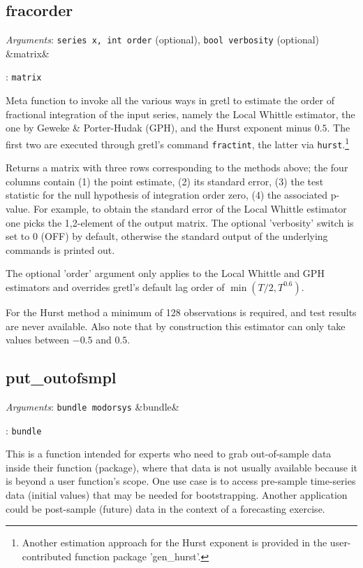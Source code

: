 \documentclass[11pt,english]{article}
\newcommand{\ArgRet}[2]{%
  {\it Arguments}: {#1}%
  \ifx&#2&%
  \else
  \par\smallskip\noindent {\it Return type}: \texttt{#2}
  \fi%
  \par\medskip\par%
  }
\begin{document}
\subsection{fracorder}

\ArgRet{\texttt{series x, int order} (optional), \texttt{bool verbosity}
 (optional)}{matrix}

Meta function to invoke all the various ways in gretl to estimate the order of
fractional integration of the input series, namely the Local Whittle estimator,
the one by Geweke \& Porter-Hudak (GPH), and the Hurst exponent minus $0.5$.
The first two are executed through gretl's command \texttt{fractint}, the
latter via \texttt{hurst}.\footnote{Another estimation approach for the Hurst
exponent is provided in the user-contributed function package 'gen\_hurst'.}

Returns a matrix with three rows corresponding to the methods above; the four
columns contain (1) the point estimate, (2) its standard error, (3) the test
statistic for the null hypothesis of integration order zero, (4) the associated
p-value. For example, to obtain the standard error of the Local Whittle
estimator one picks the 1,2-element of the output matrix. The optional
'verbosity' switch is set to 0 (OFF) by default, otherwise the standard output
of the underlying commands is printed out.

The optional 'order' argument only applies to the Local Whittle and GPH
estimators and overrides gretl's default lag order of $\min(T/2, T^{0.6})$.

For the Hurst method a minimum of 128 observations is required, and test
results are never available. Also note that by construction this estimator can
only take values between $-0.5$ and $0.5$.

\subsection{put\_outofsmpl}

\ArgRet{\texttt{bundle modorsys}}{bundle}

This is a function intended for experts who need to grab out-of-sample data
inside their function (package), where that data is not usually available
because it is beyond a user function's scope. One use case is to access
pre-sample time-series data (initial values) that may be needed for
bootstrapping. Another application could be post-sample (future) data in the
context of a forecasting exercise. 
\end{document}

